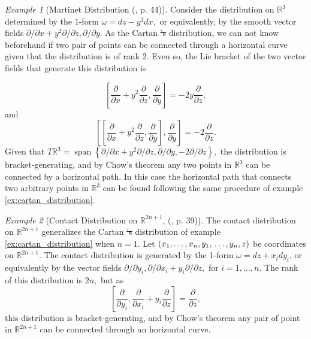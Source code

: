 \documentclass[12pt, letterpaper, reqno]{amsart}
\theoremstyle{definition}
\theoremstyle{plain}
\theoremstyle{remark}
\newtheorem{ex}{Example}
\providecommand{\DIFdel}[1]{{\protect\color{red}\sout{#1}}}                      %
\providecommand{\DIFdelbegin}{} %
\providecommand{\DIFdelend}{} %
\newcommand{\DIFscaledelfig}{0.5}
\newlength{\DIFdelgraphicswidth} %
\newlength{\DIFdelgraphicsheight} %
\newcommand{\DIFdelincludegraphics}[2][]{%
\sbox{\DIFdelgraphicsbox}{\DIFOincludegraphics[#1]{#2}}%
\settoboxwidth{\DIFdelgraphicswidth}{\DIFdelgraphicsbox} %
\settoboxtotalheight{\DIFdelgraphicsheight}{\DIFdelgraphicsbox} %
\scalebox{\DIFscaledelfig}{%
\parbox[b]{\DIFdelgraphicswidth}{\usebox{\DIFdelgraphicsbox}\\[-\baselineskip] \rule{\DIFdelgraphicswidth}{0em}}\llap{\resizebox{\DIFdelgraphicswidth}{\DIFdelgraphicsheight}{%
\setlength{\unitlength}{\DIFdelgraphicswidth}%
\begin{picture}(1,1)%
\thicklines\linethickness{2pt} %
{\color[rgb]{1,0,0}\put(0,0){\framebox(1,1){}}}%
{\color[rgb]{1,0,0}\put(0,0){\line( 1,1){1}}}%
{\color[rgb]{1,0,0}\put(0,1){\line(1,-1){1}}}%
\end{picture}%
}\hspace*{3pt}}} %
} %
\DeclareRobustCommand{\DIFdelbegin}{\DIFOdelbegin \let\includegraphics\DIFdelincludegraphics} %
\DeclareRobustCommand{\DIFdelend}{\DIFOaddend \let\includegraphics\DIFOincludegraphics} %
\begin{document}
\begin{ex}[Martinet Distribution (\cite{montgomery2002tour}, p. 44)]
	Consider the distribution on $ \mathbb{R}^3 $ determined by the 1-form $ \omega = dz-y^2dx, $ or equivalently, by the smooth vector fields $ \partial/\partial x+y^2\partial/\partial z, \partial/\partial y $. As the Cartan \DIFdelbegin \DIFdel{'s }\DIFdelend distribution, we can not know beforehand if two pair of points can be connected through a horizontal curve given that the distribution is of rank $ 2. $ Even so, the Lie bracket of the two vector fields that generate this distribution is  

	$$ \left[ \frac{\partial }{\partial x} + y^2 \frac{\partial }{\partial z} , \frac{\partial }{\partial y}  \right] =-2y \frac{\partial }{\partial z}, $$ 
	and 
	$$ \left[\left[ \frac{\partial }{\partial x} + y^2 \frac{\partial }{\partial z} , \frac{\partial }{\partial y}  \right], \frac{\partial }{\partial y} \right] = -2 \frac{\partial }{\partial z}.  $$ 
	Given that $ T \mathbb{R}^3 = \operatorname{span} \left\{ \partial/\partial x+ y^2\partial/\partial z, \partial/\partial y, -2\partial/\partial z \right\},  $ the distribution is bracket-generating, and by Chow's theorem any two points in $ \mathbb{R}^3 $ can be connected by a horizontal path. In this case the horizontal path that connects two arbitrary points in $ \mathbb{R}^3 $ can be found following the same procedure of example \ref{ex:cartan_distribution}.
\end{ex}

\begin{ex}[Contact Distribution on $ \mathbb{R}^{2n+1} $, (\cite{montgomery2002tour}, p. 39)]
	The contact distribution on $ \mathbb{R}^{2n+1} $ generalizes the Cartan \DIFdelbegin \DIFdel{'s }\DIFdelend distribution of example \ref{ex:cartan_distribution} when $ n=1 $. Let $ (x_1,\dots,x_n,y_1,\\\dots, y_n,z) $ be coordinates on $ \mathbb{R}^{2n+1} $. The contact distribution is generated by the 1-form $ \omega = dz+ x_i dy_i$, or equivalently by the vector fields $ \partial/ \partial y_i, \partial/ \partial x_i+ y_i \partial/\partial z, $ for $ i=1,\dots, n. $ The rank of this distribution is $ 2n, $ but as 
	$$ \left[ \frac{\partial }{\partial y_i} , \frac{\partial }{\partial x_i} + y_i \frac{\partial }{\partial z}  \right] = \frac{\partial }{\partial z},  $$ 
	this distribution is bracket-generating, and by Chow's theorem any pair of point in $ \mathbb{R}^{2n+1} $ can be connected through an horizontal curve.
\end{ex}
\end{document}
